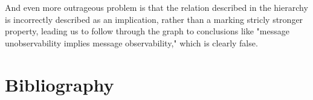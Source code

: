 \documentclass{article}
\begin{document}
And even more outrageous problem is that the relation described in the hierarchy is incorrectly described as an implication, rather than a marking stricly stronger property, leading us to follow through the graph to conclusions like "message unobservability implies message observability," which is clearly false.



\section{Bibliography}



\end{document}
